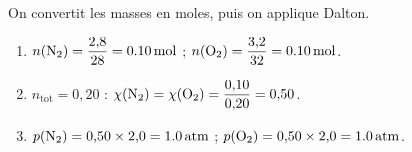 \documentclass[11pt,a4paper]{article}
\begin{document}
\begin{corrige}
On convertit les masses en moles, puis on applique Dalton.
\begin{enumerate}[label=\alph*)]
  \item $n(\ce{N2})=\dfrac{2{,}8}{28}=\qty{0.10}{\mole}$ ; $n(\ce{O2})=\dfrac{3{,}2}{32}=\qty{0.10}{\mole}$.
  \item $n_{\text{tot}}=0{,}20$ : $\chi(\ce{N2})=\chi(\ce{O2})=\dfrac{0{,}10}{0{,}20}=0{,}50$.
  \item $p(\ce{N2})=0{,}50\times2{,}0=\qty{1.0}{atm}$ ; $p(\ce{O2})=0{,}50\times2{,}0=\qty{1.0}{atm}$.
\end{enumerate}
\end{corrige}
\end{document}
